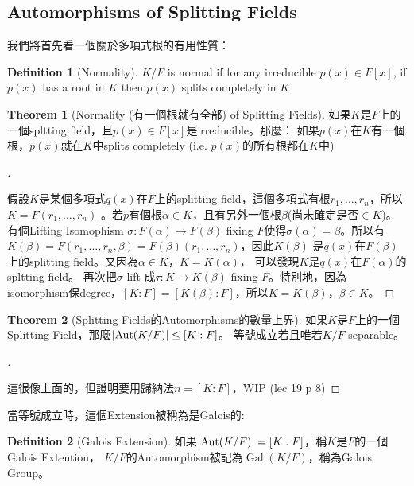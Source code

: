 \documentclass[12pt]{article}
\theoremstyle{definition}
\newtheorem{thm}{Theorem}
\newtheorem{dfn}{Definition}
\newenvironment{proofs}[1][\proofname]{%
  \begin{proof}[#1]$ $\par\nobreak\ignorespaces
}{%
  \end{proof}
}
\DeclareMathOperator{\Aut}{Aut}
\DeclareMathOperator{\Gal}{Gal}
\begin{document}
\subsection{Automorphisms of Splitting Fields}

我們將首先看一個關於多項式根的有用性質：
\begin{dfn}[Normality]
	$K/F$ is normal if for any irreducible $p(x)\in F[x]$, if $p(x)$ has a root in $K$ then $p(x)$ splits completely in $K$
\end{dfn}

\begin{thm}[Normality (有一個根就有全部) of Splitting Fields]
	如果$K$是$F$上的一個spltting field，且$p(x)\in F[x]$是irreducible。那麼：
	如果$p(x)$在$K$有一個根，$p(x)$就在$K$中splits completely
	(i.e. $p(x)$的所有根都在$K$中)
\end{thm}

\begin{proofs}
	假設$K$是某個多項式$q(x)$在$F$上的splitting field，這個多項式有根$r_1,\ldots,r_n$，所以$K=F(r_1,\ldots, r_n)$
	。若$p$有個根$\alpha\in K$，且有另外一個根$\beta$(尚未確定是否$\in K$)。有個Lifting Isomophism
	$\sigma:F(\alpha)\to F(\beta)$ fixing $F$使得$\sigma(\alpha)=\beta$。所以有$K(\beta)
		=F(r_1,\ldots,r_n,\beta)=F(\beta)(r_1,\ldots,r_n)$，因此$K(\beta)$
	是$q(x)$在$F(\beta)$上的splitting field。又因為$\alpha\in K$，$K=K(\alpha)$，
	可以發現$K$是$q(x)$在$F(\alpha)$的spltting field。
	再次把$\sigma$ lift 成$\tau: K\to K(\beta)$ fixing $F$。特別地，因為isomorphism保degree，$[K:F]=[K(\beta):F]$，所以$K=K(\beta)$，$\beta\in K$。
\end{proofs}

\begin{thm}[Splitting Fields的Automorphisms的數量上界]\label{automorphism_upper_bound}
	如果$K$是$F$上的一個Splitting Field，那麼$\abs{\Aut(K/F)} \le [K:F]$。
	等號成立若且唯若$K/F$ separable。
\end{thm}

\begin{proofs}
	這很像上面的，但證明要用歸納法$n=[K:F]$，WIP (lec 19 p 8)
\end{proofs}

當等號成立時，這個Extension被稱為是Galois的:
\begin{dfn}[Galois Extension]
	如果$\abs{\Aut(K/F)} = [K:F]$，稱$K$是$F$的一個Galois Extention，
	$K/F$的Automorphism被記為$\Gal(K/F)$，稱為Galois Group。
\end{dfn}
\end{document}
